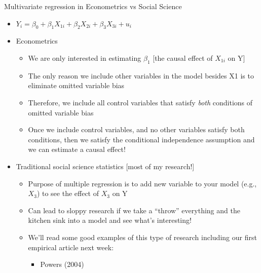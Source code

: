 \documentclass[
  8pt,
  ignorenonframetext,
  dvipsnames]{beamer}
\providecommand{\tightlist}{%
  \setlength{\itemsep}{0pt}\setlength{\parskip}{0pt}}
\let\olditem\item
\renewcommand{\item}{%
  \olditem\vspace{4pt}
}
\begin{document}
\begin{frame}{Multivariate regression in Econometrics vs Social Science}
\protect\hypertarget{multivariate-regression-in-econometrics-vs-social-science}{}

\begin{itemize}
\tightlist
\item
  \(Y_i = \beta_0 + \beta_1X_{1i} + \beta_2X_{2i} + \beta_3X_{3i} + u_i\)
\item
  Econometrics

  \begin{itemize}
  \tightlist
  \item
    We are only interested in estimating \(\beta_1\) {[}the causal
    effect of \(X_{1i}\) on Y{]}
  \item
    The only reason we include other variables in the model besides X1
    is to eliminate omitted variable bias
  \item
    Therefore, we include all control variables that satisfy \emph{both}
    conditions of omitted variable bias
  \item
    Once we include control variables, and no other variables satisfy
    both conditions, then we satisfy the conditional independence
    assumption and we can estimate a causal effect!
  \end{itemize}
\item
  Traditional social science statistics {[}most of my research!{]}

  \begin{itemize}
  \tightlist
  \item
    Purpose of multiple regression is to add new variable to your model
    (e.g., \(X_3\)) to see the effect of \(X_3\) on Y
  \item
    Can lead to sloppy research if we take a ``throw'' everything and
    the kitchen sink into a model and see what's interesting!
  \item
    We'll read some good examples of this type of research including our
    first empirical article next week:

    \begin{itemize}
    \tightlist
    \item
      Powers (2004)
    \end{itemize}
  \end{itemize}
\end{itemize}

\end{frame}
\end{document}
